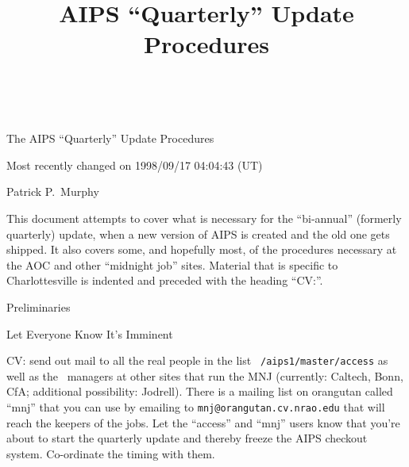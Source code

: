 


\title{AIPS ``Quarterly'' Update Procedures} \ \vskip 2cm
\centerline{\nraofont The AIPS ``Quarterly'' Update Procedures} \medskip
\centerline{Most recently changed on 1998/09/17 04:04:43 (UT)} \bigskip
\centerline{Patrick P.~Murphy} \bigskip
\bigskip

This document attempts to cover what is necessary for the ``bi-annual''
(formerly quarterly) update, when a new version of AIPS is created and
the old one gets shipped.  It also covers some, and hopefully most, of
the procedures necessary at the AOC and other ``midnight job'' sites.
Material that is specific to Charlottesville is indented and preceded
with the heading ``CV:''.

\newsection Preliminaries

\newsubsection Let Everyone Know It's Imminent

\item{CV:} send out mail to all the real people in the list {\tt
/aips1/master/access} as well as the \AIPS\ managers at other sites that
run the MNJ (currently: Caltech, Bonn, CfA; additional possibility:
Jodrell).  There is a mailing list on orangutan called ``mnj'' that you
can use by emailing to {\tt mnj@orangutan.cv.nrao.edu} that will reach
the keepers of the jobs.  Let the ``access'' and ``mnj'' users know that
you're about to start the quarterly update and thereby freeze the AIPS
checkout system.  Co-ordinate the timing with them.

